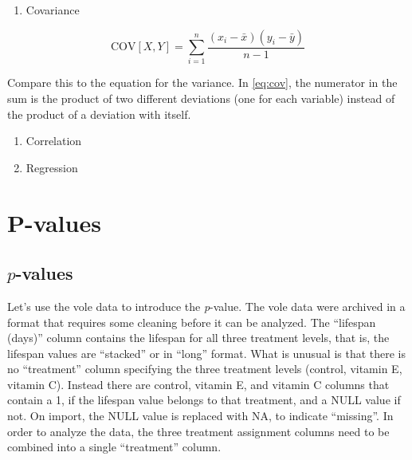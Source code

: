 \documentclass[]{book}
\providecommand{\tightlist}{%
  \setlength{\itemsep}{0pt}\setlength{\parskip}{0pt}}
\begin{document}
\begin{enumerate}
\def\labelenumi{\arabic{enumi}.}
\tightlist
\item
  Covariance
\end{enumerate}

\begin{equation}
\mathrm{COV}[X, Y] = \sum_{i=1}^n{\frac{(x_i - \bar{x})(y_i - \bar{y})}{n-1}}
\label{eq:cov}
\end{equation}

Compare this to the equation for the variance. In \eqref{eq:cov}, the
numerator in the sum is the product of two different deviations (one for
each variable) instead of the product of a deviation with itself.

\begin{enumerate}
\def\labelenumi{\arabic{enumi}.}
\setcounter{enumi}{1}
\item
  Correlation
\item
  Regression
\end{enumerate}

\chapter{P-values}\label{p-values}

\section{\texorpdfstring{\(p\)-values}{p-values}}\label{p-values-1}

Let's use the vole data to introduce the \emph{p}-value. The vole data
were archived in a format that requires some cleaning before it can be
analyzed. The ``lifespan (days)'' column contains the lifespan for all
three treatment levels, that is, the lifespan values are ``stacked'' or
in ``long'' format. What is unusual is that there is no ``treatment''
column specifying the three treatment levels (control, vitamin E,
vitamin C). Instead there are control, vitamin E, and vitamin C columns
that contain a 1, if the lifespan value belongs to that treatment, and a
NULL value if not. On import, the NULL value is replaced with NA, to
indicate ``missing''. In order to analyze the data, the three treatment
assignment columns need to be combined into a single ``treatment''
column.
\end{document}
